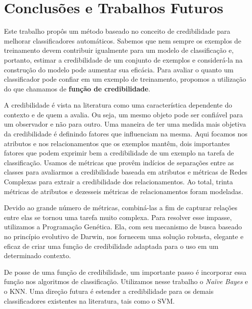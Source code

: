 \chapter{Conclusões e Trabalhos Futuros}
\label{cap::conclusoes}

Este trabalho propôs um método baseado no conceito de credibilidade para melhorar classificadores automáticos.
Sabemos que nem sempre os exemplos de treinamento devem contribuir igualmente para um modelo de classificação e, portanto, estimar a credibilidade de um conjunto de exemplos e considerá-la na construção do modelo pode aumentar sua eficácia.
Para avaliar o quanto um classificador pode confiar em um exemplo de treinamento, propomos a utilização do que chamamos de \textbf{função de credibilidade}.

A credibilidade é vista na literatura como uma característica dependente do contexto e de quem a avalia. Ou seja, um mesmo objeto pode ser confiável para um observador e não para outro.
Uma maneira de ter uma medida mais objetiva da credibilidade é definindo fatores que influenciam na mesma.
Aqui focamos nos atributos e nos relacionamentos que os exemplos mantêm, dois importantes fatores que podem exprimir bem a credibilidade de um exemplo na tarefa de classificação.
Usamos de métricas que provêm indícios de separações entre as classes para avaliarmos a credibilidade baseada em atributos e métricas de Redes Complexas para extrair a credibilidade dos relacionamentos. Ao total, trinta métricas de atributos e dezesseis métricas de relacionamentos foram modeladas.

Devido ao grande número de métricas, combiná-las a fim de capturar relações entre elas se tornou uma tarefa muito complexa.
Para resolver esse impasse, utilizamos a Programação Genética. Ela, com seu mecanismo de busca baseado no princípio evolutivo de Darwin, nos fornecem uma solução robusta, elegante e eficaz de criar uma função de credibilidade adaptada para o uso em um determinado contexto.

De posse de uma função de credibilidade, um importante passo é incorporar essa função nos algoritmos de classificação. Utilizamos nesse trabalho o \textit{Naïve Bayes} e o \textsc{KNN}. Uma direção futura é estender a credibilidade para os demais classificadores existentes na literatura, tais como o \textsc{SVM}.

